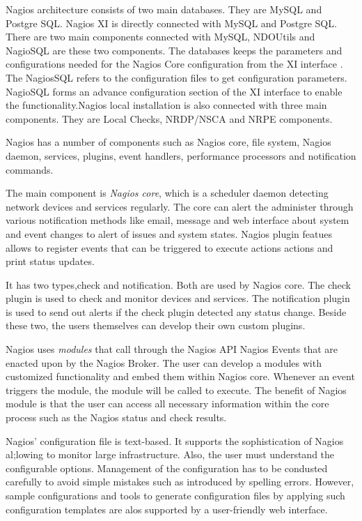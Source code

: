 \documentclass[9pt,twocolumn,twoside]{../../styles/osajnl}
\begin{document}
Nagios architecture consists of two main databases. They are MySQL and
Postgre SQL.  Nagios XI is directly connected with MySQL and Postgre
SQL. There are two main components connected with MySQL, NDOUtils and
NagioSQL are these two components. The databases keeps the parameters
and configurations needed for the Nagios Core configuration from the
XI interface \cite{archi-nagios}. The NagiosSQL refers to the
configuration files to get configuration parameters. NagioSQL forms an
advance configuration section of the XI interface to enable the
functionality.Nagios local installation is also connected with three
main components. They are Local Checks, NRDP/NSCA and NRPE components.

Nagios has a number of components such as Nagios core, file system,
Nagios daemon, services, plugins, event handlers, performance processors
and notification commands.

The main component is {\em Nagios core}, which is a scheduler daemon
detecting network devices and services regularly. The core can alert
the administer through various notification methods like email,
message and web interface about system and event changes to alert of
issues and system states. Nagios plugin featues allows to register
events that can be triggered to execute actions actions and print
status updates.

It has two types,check and notification. Both are used by Nagios
core. The check plugin is used to check and monitor devices and
services. The notification plugin is used to send out alerts if the
check plugin detected any status change. Beside these two, the users
themselves can develop their own custom plugins.

Nagios uses {\em modules} that call through the Nagios API Nagios
Events that are enacted upon by the Nagios Broker. The user can
develop a modules with customized functionality and embed them within
Nagios core. Whenever an event triggers the module, the module
will be called to execute. The benefit of Nagios module is that the
user can access all necessary information within the core process such
as the Nagios status and check results.

Nagios' configuration file is text-based. It supports the
sophistication of Nagios al;lowing to monitor large
infrastructure. Also, the user must understand the configurable
options. Management of the configuration has to be condusted carefully
to avoid simple mistakes such as introduced by spelling
errors. However, sample configurations and tools to generate
configuration files by applying such configuration templates are alos
supported by a user-friendly web interface.
\end{document}
